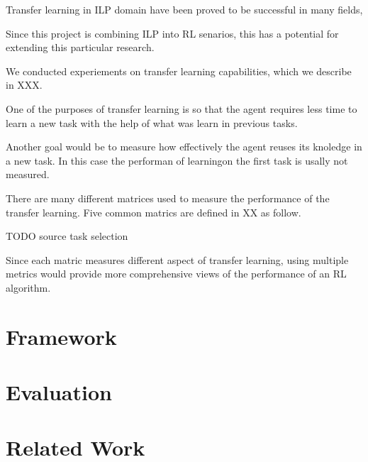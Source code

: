 \documentclass[11pt,twoside]{report}
\theoremstyle{plain}
\theoremstyle{definition}
\begin{document}
Transfer learning in ILP domain have been proved to be successful in many fields,

Since this project is combining ILP into RL senarios, this has a potential for extending this particular research.

We conducted experiements on transfer learning capabilities, which we describe in XXX.

One of the  purposes of transfer learning is so that the agent requires less time to learn a new task with the help of what was learn in previous tasks.


Another goal would be to measure how effectively the agent reuses its knoledge in a new task.
In this case the performan of learningon the first task is usally not measured.

There are many different matrices used to measure the performance of the transfer learning.
Five common matrics are defined in XX as follow.

TODO source task selection

%

Since each matric measures different aspect of transfer learning, using multiple metrics would provide more comprehensive views of the performance of an RL algorithm.
%

\chapter{Framework}
\label{framework}


\chapter{Evaluation}
\label{evaluation}


\chapter{Related Work}
\label{related_work}

\end{document}
